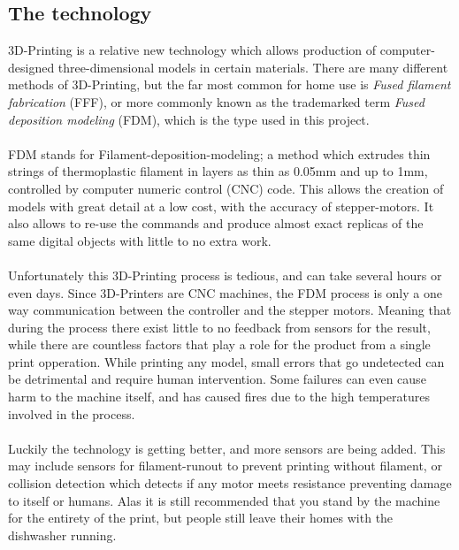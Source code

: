 \documentclass[a4paper, 12pt]{article}
\newcommand{\mysubsection}[1]{\subsection*{#1} \addcontentsline{toc}{subsection}{#1}}
\begin{document}
    \mysubsection{The technology}
    3D-Printing is a relative new technology which allows production of computer-designed three-dimensional models
    in certain materials.
    There are many different methods of 3D-Printing, but the far most common for home use is \textit{Fused filament 
    fabrication} (FFF), or more commonly known as the trademarked term \textit{Fused deposition modeling} (FDM),
    which is the type used in this project.
    \\\\
    FDM stands for Filament-deposition-modeling; a method which extrudes thin strings of thermoplastic filament 
    in layers as thin as 0.05mm and up to 1mm, controlled by computer numeric control (CNC) code.
    This allows the creation of models with great detail at a low cost, with the accuracy of stepper-motors.
    It also allows to re-use the commands and produce almost exact replicas of the same digital objects with 
    little to no extra work.
    \\\\
    Unfortunately this 3D-Printing process is tedious, and can take several hours or even days.
    Since 3D-Printers are CNC machines, the FDM process is only a one way communication between the controller
    and the stepper motors.
    Meaning that during the process there exist little to no feedback from sensors for the result, while there are countless 
    factors that play a role for the product from a single print opperation.
    While printing any model, small errors that go undetected can be detrimental and require human intervention.
    Some failures can even cause harm to the machine itself, and has caused fires due to the high temperatures involved in
    the process.
    \\\\
    Luckily the technology is getting better, and more sensors are being added. 
    This may include sensors for filament-runout to prevent printing without filament, or collision detection which detects
    if any motor meets resistance preventing damage to itself or humans.
    Alas it is still recommended that you stand by the machine for the entirety of the print, but people still leave their
    homes with the dishwasher running.
\end{document}
